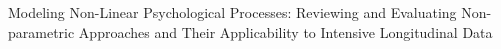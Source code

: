 Modeling Non-Linear Psychological Processes: Reviewing and Evaluating
  Non-parametric Approaches and Their Applicability to Intensive
  Longitudinal Data